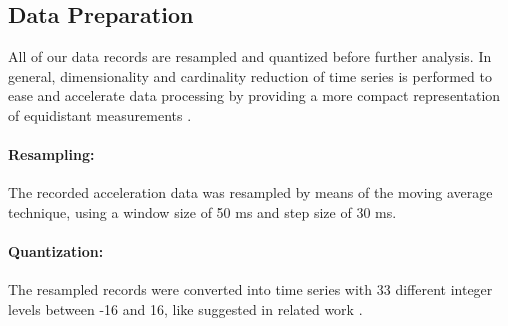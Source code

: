 \subsection{Data Preparation} \label{data_preparation}

All of our data records are resampled and quantized before further analysis. In general, dimensionality and cardinality reduction of time series is performed to ease and accelerate data processing by providing a more compact representation of equidistant measurements \cite{liu2009uwave}.

\paragraph{Resampling:} The recorded acceleration data was resampled by means of the moving average technique, using a window size of 50 ms and step size of 30 ms.

\paragraph{Quantization:} The resampled records were converted into time series with 33 different integer levels between -16 and 16, like suggested in related work \cite{liu2009uwave}.
